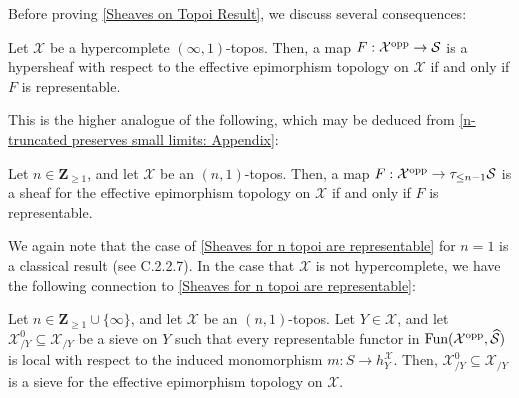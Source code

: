\documentclass[10pt]{article}
\newcommand{\mS}{\mathcal S}
\newcommand{\cX}{\mathcal{X}}
\newcommand{\ZZ}{\mathbb{Z}}
\def\ZZ{{\mathbf Z}}
\theoremstyle{witharg}
\theoremstyle{witharg}
\theoremstyle{witharg2}
\begin{document}
\noindent Before proving \ref{Sheaves on Topoi Result}, we discuss several consequences: 

\begin{corollary}{}

    Let $\cX$ be a hypercomplete $(\infty,1)$-topos. Then, a map $F:\cX^{\textnormal{opp}}\rightarrow \mS$ is a hypersheaf with respect to the effective epimorphism topology on $\cX$ if and only if $F$ is representable. 
    
\end{corollary}

\noindent This is the higher analogue of the following, which may be deduced from \ref{n-truncated preserves small limits: Appendix}:

\begin{corollary}{}\label{Sheaves for n topoi are representable}

    Let $n\in \ZZ_{\geq 1}$, and let $\cX$ be an $(n,1)$-topos. Then, a map $F:\cX^{\textnormal{opp}}\rightarrow \tau_{\leq n-1}\mS$ is a sheaf for the effective epimorphism topology on $\cX$ if and only if $F$ is representable. 
    
\end{corollary}

\noindent We again note that the case of \ref{Sheaves for n topoi are representable} for $n=1$ is a classical result (see  C.2.2.7). In the case that $\cX$ is not hypercomplete, we have the following connection to \ref{Sheaves for n topoi are representable}:


\begin{corollary}{}\label{The Canonical Topology on a Topos 1}

    Let $n\in \ZZ_{\geq 1}\cup \{\infty\}$, and let $\cX$ be an $(n,1)$-topos. Let $Y\in \cX$, and let $\cX^0_{/Y}\subseteq \cX_{/Y}$ be a sieve on $Y$ such that every representable functor in $\textnormal{Fun}(\cX^{\textnormal{opp}},\widehat{\mS})$ is local with respect to the induced monomorphism $m:S\rightarrow h^\cX_Y$. Then, $\cX^0_{/Y}\subseteq \cX_{/Y}$ is a sieve for the effective epimorphism topology on $\cX$. 
    
\end{corollary}
\end{document}
